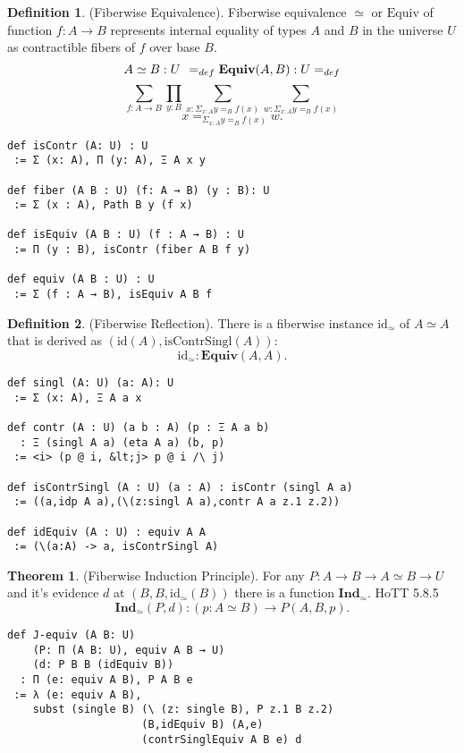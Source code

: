 \documentclass{article}
\theoremstyle{definition}
\newtheorem{definition}{Definition}
\newtheorem{theorem}{Theorem}
\begin{document}
\begin{definition} (Fiberwise Equivalence).
Fiberwise equivalence $\simeq$ or $\mathrm{Equiv}$
of function $f: A \rightarrow B$
represents internal equality of types $A$ and $B$
in the universe $U$ as contractible fibers of $f$
over base $B$.
$$
A\simeq B : U\hspace{.4em}=_{def}\mathbf{Equiv}(A,B) : U =_{def}
$$
$$
\sum_{f: A \rightarrow B}
\prod_{y:B}
\sum_{x: \Sigma_{x:A} y =_B f(x)}
\sum_{w: \Sigma_{x:A} y =_B f(x)}
$$
$$
  x =_{\Sigma_{x:A} y =_B f(x)} w.
$$
\begin{lstlisting}
def isContr (A: U) : U
 := Σ (x: A), Π (y: A), Ξ A x y

def fiber (A B : U) (f: A → B) (y : B): U
 := Σ (x : A), Path B y (f x)

def isEquiv (A B : U) (f : A → B) : U
 := Π (y : B), isContr (fiber A B f y)

def equiv (A B : U) : U
 := Σ (f : A → B), isEquiv A B f
\end{lstlisting}
\end{definition}

\begin{definition} (Fiberwise Reflection).
There is a fiberwise instance $\mathrm{id_\simeq}$
of $A\simeq A$ that is derived
as $(\mathrm{id}(A),\mathrm{isContrSingl}(A))$:
$$
  \mathrm{id}_\simeq : \mathbf{Equiv}(A,A).
$$
\begin{lstlisting}
def singl (A: U) (a: A): U
 := Σ (x: A), Ξ A a x

def contr (A : U) (a b : A) (p : Ξ A a b)
  : Ξ (singl A a) (eta A a) (b, p)
 := <i> (p @ i, &lt;j> p @ i /\ j)

def isContrSingl (A : U) (a : A) : isContr (singl A a)
 := ((a,idp A a),(\(z:singl A a),contr A a z.1 z.2))

def idEquiv (A : U) : equiv A A
 := (\(a:A) -> a, isContrSingl A)
\end{lstlisting}
\end{definition}

\begin{theorem} (Fiberwise Induction Principle).
For any $P : A \rightarrow B \rightarrow A \simeq B \rightarrow U$
and it's evidence $d$ at $(B,B,\mathrm{id_\simeq}(B))$
there is a function $\mathbf{Ind}_\simeq$. HoTT 5.8.5
$$
  \mathbf{Ind}_\simeq(P,d) : (p: A\simeq B) \rightarrow P(A,B,p).
$$
\begin{lstlisting}
def J-equiv (A B: U)
    (P: Π (A B: U), equiv A B → U)
    (d: P B B (idEquiv B))
  : Π (e: equiv A B), P A B e
 := λ (e: equiv A B),
    subst (single B) (\ (z: single B), P z.1 B z.2)
                     (B,idEquiv B) (A,e)
                     (contrSinglEquiv A B e) d
\end{lstlisting}
\end{theorem}
\end{document}
